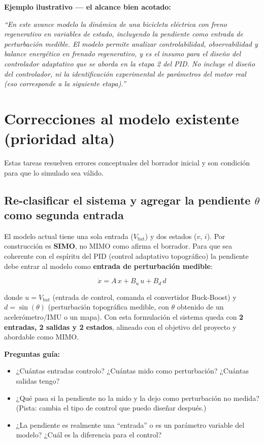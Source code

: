 \documentclass[11pt,a4paper]{article}
\begin{document}
\begin{ejemplo}
\textbf{Ejemplo ilustrativo --- el alcance bien acotado:}

\textit{``En este avance modelo la dinámica de una bicicleta eléctrica con freno regenerativo en variables de estado, incluyendo la pendiente como entrada de perturbación medible. El modelo permite analizar controlabilidad, observabilidad y balance energético en frenado regenerativo, y es el insumo para el diseño del controlador adaptativo que se aborda en la etapa 2 del PID. No incluye el diseño del controlador, ni la identificación experimental de parámetros del motor real (eso corresponde a la siguiente etapa).''}
\end{ejemplo}

\hrulefill

\section{Correcciones al modelo existente (prioridad alta)}

Estas tareas resuelven errores conceptuales del borrador inicial y son condición para que lo simulado sea válido.

\subsection{Re-clasificar el sistema y agregar la pendiente \texorpdfstring{$\theta$}{theta} como segunda entrada}

El modelo actual tiene una sola entrada ($V_{\text{bat}}$) y dos estados ($v$, $i$). Por construcción es \textbf{SIMO}, no MIMO como afirma el borrador. Para que sea coherente con el espíritu del PID (control adaptativo topográfico) la pendiente debe entrar al modelo como \textbf{entrada de perturbación medible}:

\begin{equation}
\dot{x} = A\,x + B_u\,u + B_d\,d
\end{equation}

donde $u = V_{\text{bat}}$ (entrada de control, comanda el convertidor Buck-Boost) y $d = \sin(\theta)$ (perturbación topográfica medible, con $\theta$ obtenido de un acelerómetro/IMU o un mapa). Con esta formulación el sistema queda con \textbf{2 entradas, 2 salidas y 2 estados}, alineado con el objetivo del proyecto y abordable como MIMO.

\begin{guia}
\textbf{Preguntas guía:}
\begin{itemize}
    \item ¿Cuántas entradas controlo? ¿Cuántas mido como perturbación? ¿Cuántas salidas tengo?
    \item ¿Qué pasa si la pendiente no la mido y la dejo como perturbación no medida? (Pista: cambia el tipo de control que puedo diseñar después.)
    \item ¿La pendiente es realmente una ``entrada'' o es un parámetro variable del modelo? ¿Cuál es la diferencia para el control?
\end{itemize}
\end{guia}
\end{document}
